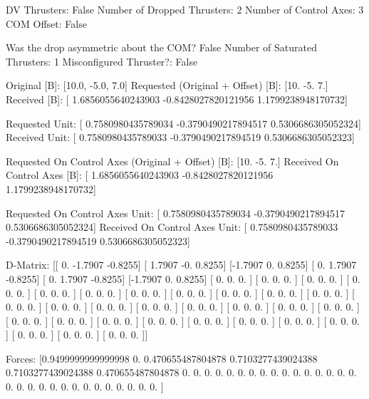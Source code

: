DV Thrusters:	False
Number of Dropped Thrusters:	2
Number of Control Axes:	3
COM Offset:	False

Was the drop asymmetric about the COM?	False
Number of Saturated Thrusters:	1
Misconfigured Thruster?:	False

Original [B]:	[10.0, -5.0, 7.0]
Requested (Original + Offset) [B]:	[10. -5.  7.]
Received [B]:		[ 1.6856055640243903 -0.8428027820121956  1.1799238948170732]

Requested Unit:		[ 0.7580980435789034 -0.3790490217894517  0.5306686305052324]
Received Unit:		[ 0.7580980435789033 -0.3790490217894519  0.5306686305052323]

Requested On Control Axes (Original + Offset) [B]:	[10. -5.  7.]
Received On Control Axes [B]:		[ 1.6856055640243903 -0.8428027820121956  1.1799238948170732]

Requested On Control Axes Unit:		[ 0.7580980435789034 -0.3790490217894517  0.5306686305052324]
Received On Control Axes Unit:		[ 0.7580980435789033 -0.3790490217894519  0.5306686305052323]

D-Matrix:
[[ 0.     -1.7907 -0.8255]
 [ 1.7907 -0.      0.8255]
 [-1.7907  0.      0.8255]
 [ 0.      1.7907 -0.8255]
 [ 0.      1.7907 -0.8255]
 [-1.7907  0.      0.8255]
 [ 0.      0.      0.    ]
 [ 0.      0.      0.    ]
 [ 0.      0.      0.    ]
 [ 0.      0.      0.    ]
 [ 0.      0.      0.    ]
 [ 0.      0.      0.    ]
 [ 0.      0.      0.    ]
 [ 0.      0.      0.    ]
 [ 0.      0.      0.    ]
 [ 0.      0.      0.    ]
 [ 0.      0.      0.    ]
 [ 0.      0.      0.    ]
 [ 0.      0.      0.    ]
 [ 0.      0.      0.    ]
 [ 0.      0.      0.    ]
 [ 0.      0.      0.    ]
 [ 0.      0.      0.    ]
 [ 0.      0.      0.    ]
 [ 0.      0.      0.    ]
 [ 0.      0.      0.    ]
 [ 0.      0.      0.    ]
 [ 0.      0.      0.    ]
 [ 0.      0.      0.    ]
 [ 0.      0.      0.    ]
 [ 0.      0.      0.    ]
 [ 0.      0.      0.    ]
 [ 0.      0.      0.    ]
 [ 0.      0.      0.    ]
 [ 0.      0.      0.    ]
 [ 0.      0.      0.    ]]

Forces:
[0.9499999999999998 0.                 0.470655487804878
 0.7103277439024388 0.7103277439024388 0.470655487804878
 0.                 0.                 0.
 0.                 0.                 0.
 0.                 0.                 0.
 0.                 0.                 0.
 0.                 0.                 0.
 0.                 0.                 0.
 0.                 0.                 0.
 0.                 0.                 0.
 0.                 0.                 0.
 0.                 0.                 0.                ]

